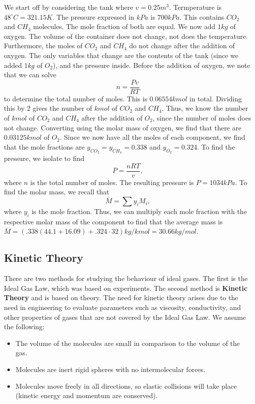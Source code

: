 \documentclass[11pt]{article}
\theoremstyle{plain} %
\theoremstyle{definition}
\theoremstyle{example}
\theoremstyle{remark}
\begin{document}
We start off by considering the tank where $v = 0.25m^3$. Termperature is $48^{\circ}C = 321.15K$. The pressure expressed in $kPa$ is $700kPa$. This contains $CO_2$ and $CH_4$ molecules. The mole fraction of both are equal. We now add $1kg$ of oxygen. The volume of the container does not change, not does the temperature. Furthermore, the moles of $CO_2$ and $CH_4$ do not change after the addition of oxygen. The only variables that change are the contents of the tank (since we added $1kg$ of $O_2$), and the pressure inside. Before the addition of oxygen, we note that we can solve $$n = \frac{Pv}{RT}$$
to determine the total number of moles. This is $0.06554kmol$ in total. Dividing this by 2 gives the number of $kmol$ of $CO_2$ and $CH_4$. Thus, we know the number of $kmol$ of $CO_2$ and $CH_4$ after the addition of $O_2$, since the number of moles does not change. Converting using the molar mass of oxygen, we find that there are $0.03125kmol$ of $O_2$. Since we now have all the moles of each component, we find that the mole fractions are $y_{CO_2} = y_{CH_4} = 0.338$ and $y_{O_2} = 0.324$. 
\newline To find the pressure, we isolate to find $$P = \frac{nRT}{v},$$
where $n$ is the total number of moles. The resulting pressure is $P = 1034 kPa$. 
\newline To find the molar mass, we recall that 
$$\overline{M} = \sum y_iM_i,$$
where $y_i$ is the mole fraction. Thus, we can multiply each mole fraction with the respective molar mass of the component to find that the average mass is $\overline{M} = (.338(44.1+16.09) + .324\cdot 32)kg/kmol = 30.66kg/mol$. 

\subsection{Kinetic Theory}

There are two methods for studying the behaviour of ideal gases. The first is the Ideal Gas Law, which was based on experiments. The second method is \textbf{Kinetic Theory} and is based on theory. The need for kinetic theory arises due to the need in engineering to evaluate parameters such as viscosity, conductivity, and other properties of gases that are not covered by the Ideal Gas Law. We assume the following:
\begin{itemize}
	\item The volume of the molecules are small in comparison to the volume of the gas. 
	\item Molecules are inert rigid spheres with no intermolecular forces. 
	\item Molecules move freely in all directions, so elastic collisions will take place (kinetic energy and momentum are conserved). 
\end{itemize}
	
\end{document}
